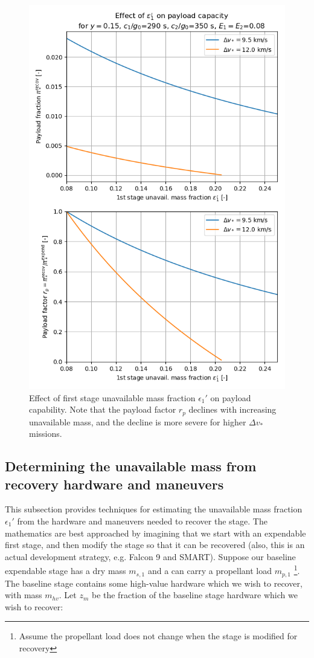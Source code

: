 \documentclass[conf]{new-aiaa}
\begin{document}
\begin{figure}[hbt!]
	\centering
	\includegraphics[width=\textwidth]{../payload}
	\caption{\label{fig:payload} Effect of first stage unavailable mass fraction $\epsilon_1'$ on payload capability. Note that the payload factor $r_p$ declines with increasing unavailable mass, and the decline is more severe for higher $\Delta v_*$ missions.}
\end{figure}


\subsection{Determining the unavailable mass from recovery hardware and maneuvers}
This subsection provides techniques for estimating the unavailable mass fraction $\epsilon_1'$ from the hardware and maneuvers needed to recover the stage. The mathematics are best approached by imagining that we start with an expendable first stage, and then modify the stage so that it can be recovered (also, this is an actual development strategy, e.g. Falcon 9 and SMART). Suppose our baseline expendable stage has a dry mass $m_{s,1}$ and a can carry a propellant load $m_{p,1}$ \footnote{Assume the propellant load does not change when the stage is modified for recovery}. The baseline stage contains some high-value hardware which we wish to recover, with mass $m_{hv}$. Let $z_m$ be the fraction of the baseline stage hardware which we wish to recover:
\end{document}
